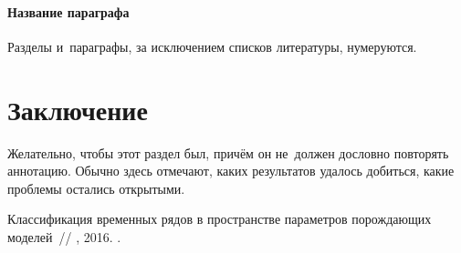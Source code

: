 \documentclass[12pt, twoside]{article}
\begin{document}
\paragraph{Название параграфа}
Разделы и~параграфы, за исключением списков литературы, нумеруются.

\section{Заключение}
Желательно, чтобы этот раздел был, причём он не~должен дословно повторять аннотацию.
Обычно здесь отмечают, каких результатов удалось добиться, какие проблемы остались открытыми.

\begin{thebibliography}{99}

    Классификация временных рядов в пространстве параметров порождающих моделей~//
    , 2016.
	.
 	
\end{thebibliography}
\end{document}
